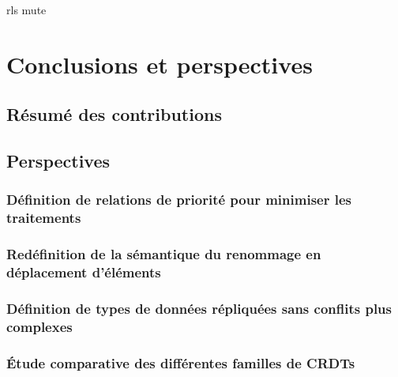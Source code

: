 \documentclass[12pt]{thesul}
\newcommand{\lepoch}{$<_{\varepsilon}$~}
\begin{document}
{rls}
{mute}

\NumberThisInToc
\chapter{Conclusions et perspectives}
\minitoc
\section{Résumé des contributions}
\section{Perspectives}


\subsection{Définition de relations de priorité pour minimiser les traitements}
\subsection{Redéfinition de la sémantique du renommage en déplacement d'éléments}
\subsection{Définition de types de données répliquées sans conflits plus complexes}

\subsection{Étude comparative des différentes familles de CRDTs}
\end{document}

